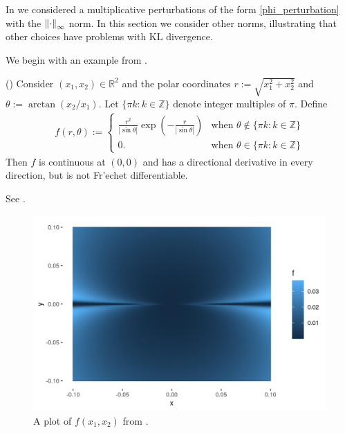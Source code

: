 In  we considered a multiplicative perturbations
of the form \eqref{phi_perturbation} with the $\left\Vert\cdot\right\Vert_{\infty}$ norm.  In
this section we consider other norms, illustrating that other choices
have problems with KL divergence.

We begin with an example from \citet{averbukh:1967:theory}.

\begin{ex}
%
(\citet[Example 1.9]{averbukh:1967:theory})
%
Consider $(x_1, x_2) \in \mathbb{R}^2$ and the polar coordinates $r :=
\sqrt{x_1^2 + x_2^2}$ and $\theta := \arctan(x_2 / x_1)$.  Let $\{\pi k: k \in
\mathbb{Z} \}$ denote integer multiples of $\pi$.  Define
%
\begin{align*}
%
f(r, \theta) := \begin{cases}
\frac{r^2}{| \sin \theta |} \exp\left( -\frac{r}{|\sin \theta|}\right)
    & \textrm{when } \theta \notin \{\pi k: k \in \mathbb{Z} \} \\
0. & \textrm{when } \theta \in \{\pi k: k \in \mathbb{Z} \}
%
\end{cases}
%
\end{align*}
%
Then $f$ is continuous at $(0, 0)$ and has a directional derivative in every
direction, but is not Fr{'e}chet differentiable.
%
\end{ex}
%
See .
%
\begin{figure}[h!]
\caption{A plot of $f(x_1, x_2)$ from .}

\includegraphics[width=0.980\linewidth,height=0.667\linewidth]{static_images/averbukh_example.png}
\centering
\end{figure}
